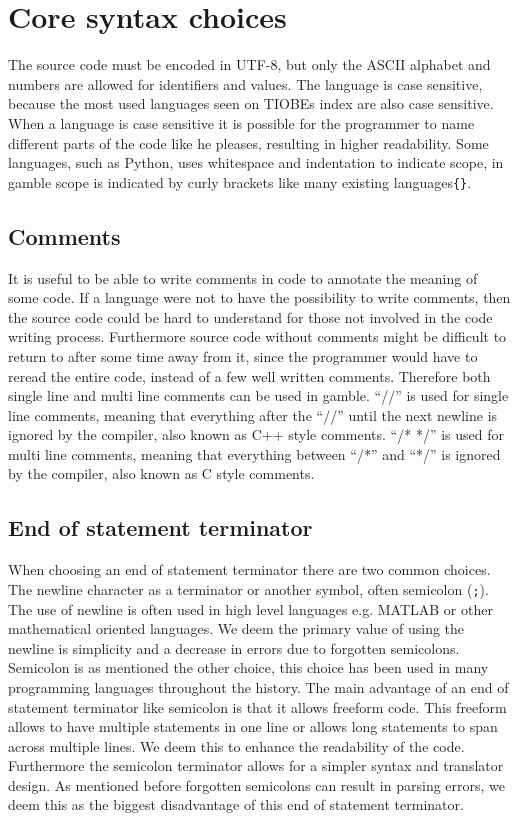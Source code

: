 \section{Core syntax choices}
The source code must be encoded in UTF-8, but only the ASCII alphabet and numbers are allowed for identifiers and values.
The language is case sensitive, because the most used languages seen on TIOBEs index are also case sensitive. \citep{TIOBE}
When a language is case sensitive it is possible for the programmer to name different parts of the code like he pleases, resulting in higher readability. 
Some languages, such as Python, uses whitespace and indentation to indicate scope, in \gls{gamble} scope is indicated by curly brackets like many existing languages\texttt{\{\}}.

\subsection*{Comments}
It is useful to be able to write comments in code to annotate the meaning of some code.
If a language were not to have the possibility to write comments, then the source code could be hard to understand for those not involved in the code writing process.
Furthermore source code without comments might be difficult to return to after some time away from it, since the programmer would have to reread the entire code, instead of a few well written comments. \citep{Commenting}
Therefore both single line and multi line comments can be used in \gls{gamble}. 
``//'' is used for single line comments, meaning that everything after the ``//'' until the next newline is ignored by the compiler, also known as C++ style comments. 
``/* */'' is used for multi line comments, meaning that everything between ``/*'' and ``*/'' is ignored by the compiler, also known as C style comments. \citep{C_comment,Cplus_comment}

\subsection*{End of statement terminator}
When choosing an end of statement terminator there are two common choices.
The newline character as a terminator or another symbol, often semicolon (\texttt{;}).
The use of newline is often used in high level languages e.g. MATLAB or other mathematical oriented languages.
We deem the primary value of using the newline is simplicity and a decrease in errors due to forgotten semicolons. 
Semicolon is as mentioned the other choice, this choice has been used in many programming languages throughout the history. 
The main advantage of an end of statement terminator like semicolon is that it allows freeform code. 
This freeform allows to have multiple statements in one line or allows long statements to span across multiple lines.
We deem this to enhance the readability of the code.
Furthermore the semicolon terminator allows for a simpler syntax and translator design.
As mentioned before forgotten semicolons can result in parsing errors, we deem this as the biggest disadvantage of this end of statement terminator.

